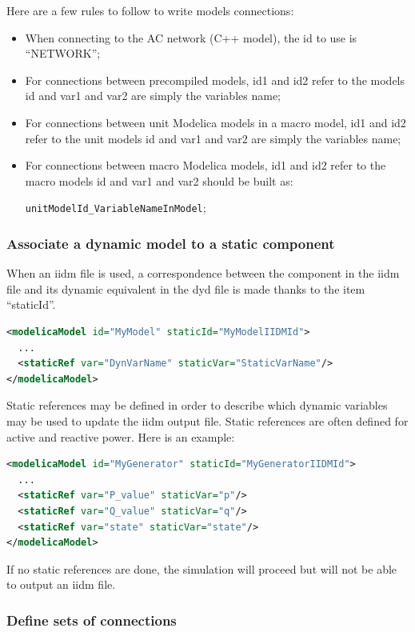 \documentclass[a4paper, 12pt]{report}
\begin{document}
Here are a few rules to follow to write models connections:
\begin{itemize}
\item When connecting to the AC network (C++ model), the id to use is ``NETWORK'';
\item For connections between precompiled models, id1 and id2 refer to the models id and var1 and var2 are simply the variables name;
\item For connections between unit Modelica models in a macro model, id1 and id2 refer to the unit models id and var1 and var2 are simply the variables name;
\item For connections between macro Modelica models, id1 and id2 refer to the macro models id and var1 and var2 should be built as:

\verb|unitModelId_VariableNameInModel|;
\end{itemize}

\subsubsection{Associate a dynamic model to a static component}

When an iidm file is used, a correspondence between the component in the iidm file and its dynamic equivalent in the dyd file is made thanks to the item ``staticId''.
\begin{lstlisting}[language=XML, morekeywords={staticId}]
<modelicaModel id="MyModel" staticId="MyModelIIDMId">
  ...
  <staticRef var="DynVarName" staticVar="StaticVarName"/>
</modelicaModel>
\end{lstlisting}

Static references may be defined in order to describe which dynamic variables may be used to update the iidm output file. Static references are often defined for active and reactive power. Here is an example:
\begin{lstlisting}[language=XML, morekeywords={staticRef}]
<modelicaModel id="MyGenerator" staticId="MyGeneratorIIDMId">
  ...
  <staticRef var="P_value" staticVar="p"/>
  <staticRef var="Q_value" staticVar="q"/>
  <staticRef var="state" staticVar="state"/>
</modelicaModel>
\end{lstlisting}

If no static references are done, the simulation will proceed but \Dynawo will not be able to output an iidm file.

\subsubsection{Define sets of connections}
\end{document}
